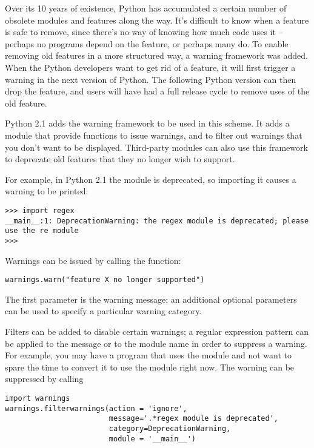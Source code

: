 \documentclass{howto}
\begin{document}
Over its 10 years of existence, Python has accumulated a certain
number of obsolete modules and features along the way.  It's difficult
to know when a feature is safe to remove, since there's no way of
knowing how much code uses it -- perhaps no programs depend on the
feature, or perhaps many do.  To enable removing old features in a
more structured way, a warning framework was added.  When the Python
developers want to get rid of a feature, it will first trigger a
warning in the next version of Python.  The following Python version
can then drop the feature, and users will have had a full release
cycle to remove uses of the old feature.  

Python 2.1 adds the warning framework to be used in this scheme.  It
adds a  module that provide functions to issue
warnings, and to filter out warnings that you don't want to be
displayed. Third-party modules can also use this framework to
deprecate old features that they no longer wish to support.

For example, in Python 2.1 the  module is deprecated,
so importing it causes a warning to be printed:

\begin{verbatim}
>>> import regex
__main__:1: DeprecationWarning: the regex module is deprecated; please use the re module
>>> 
\end{verbatim}

Warnings can be issued by calling the  function:

\begin{verbatim}
warnings.warn("feature X no longer supported")              
\end{verbatim}

The first parameter is the warning message; an additional optional
parameters can be used to specify a particular warning category.

Filters can be added to disable certain warnings; a regular expression
pattern can be applied to the message or to the module name in order
to suppress a warning.  For example, you may have a program that uses
the  module and not want to spare the time to convert it
to use the  module right now.  The warning can be
suppressed by calling

\begin{verbatim}
import warnings
warnings.filterwarnings(action = 'ignore',
                        message='.*regex module is deprecated',
                        category=DeprecationWarning,
                        module = '__main__')
\end{verbatim}
\end{document}
